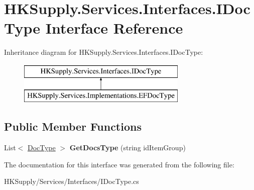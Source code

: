 \hypertarget{interface_h_k_supply_1_1_services_1_1_interfaces_1_1_i_doc_type}{}\section{H\+K\+Supply.\+Services.\+Interfaces.\+I\+Doc\+Type Interface Reference}
\label{interface_h_k_supply_1_1_services_1_1_interfaces_1_1_i_doc_type}
Inheritance diagram for H\+K\+Supply.\+Services.\+Interfaces.\+I\+Doc\+Type\+:\begin{figure}[H]
\begin{center}
\leavevmode
\includegraphics[height=2.000000cm]{interface_h_k_supply_1_1_services_1_1_interfaces_1_1_i_doc_type}
\end{center}
\end{figure}
\subsection*{Public Member Functions}
\begin{DoxyCompactItemize}
\item 
\mbox{\label{interface_h_k_supply_1_1_services_1_1_interfaces_1_1_i_doc_type_a2794563a2246ea84d2af7caff9150aee}} 
List$<$ \mbox{\hyperlink{class_h_k_supply_1_1_models_1_1_doc_type}{Doc\+Type}} $>$ {\bfseries Get\+Docs\+Type} (string id\+Item\+Group)
\end{DoxyCompactItemize}


The documentation for this interface was generated from the following file\+:\begin{DoxyCompactItemize}
\item 
H\+K\+Supply/\+Services/\+Interfaces/I\+Doc\+Type.\+cs\end{DoxyCompactItemize}
